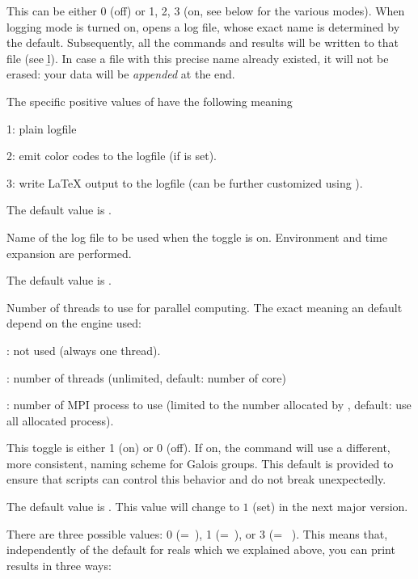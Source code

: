 \label{se:def,log}
This can be either 0 (off) or 1, 2, 3
(on, see below for the various modes). When logging mode is turned on, 
opens a log file, whose exact name is determined by the 
default. Subsequently, all the commands and results will be written to that
file (see \b{l}). In case a file with this precise name already existed, it
will not be erased: your data will be \emph{appended} at the end.

The specific positive values of  have the following meaning

1: plain logfile

2: emit color codes to the logfile (if  is set).

3: write LaTeX output to the logfile (can be further customized using
).

The default value is .

\label{se:def,logfile}
Name of the log file to be used when the  toggle is on.
Environment and time expansion are performed.

The default value is .

\label{se:def,nbthreads}
Number of threads to use for parallel computing.
The exact meaning an default depend on the  engine used:

\item {}: not used (always one thread).

\item {}: number of threads (unlimited, default: number of core)

\item {}: number of MPI process to use (limited to the number allocated by ,
default: use all allocated process).

\label{se:def,new_galois_format}
This toggle is either 1 (on) or 0 (off). If on,
the  command will use a different, more
consistent, naming scheme for Galois groups. This default is provided to
ensure that scripts can control this behavior and do not break unexpectedly.

The default value is . This value will change to $1$ (set) in the next
major version.

\label{se:def,output}
There are three possible values: 0
(=~), 1 (=~), or 3
(=~ ). This
means that, independently of the default  for reals which we
explained above, you can print results in three ways:

